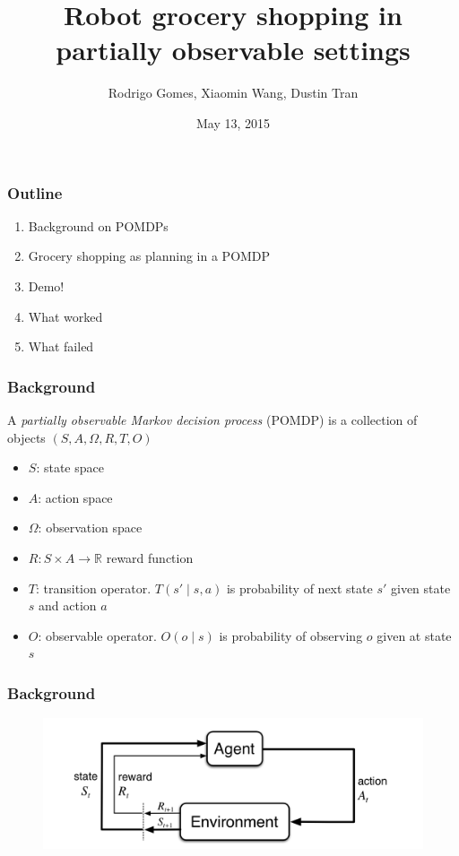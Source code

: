 \documentclass[10pt, compress]{beamer}
\title{Robot grocery shopping in partially observable settings}
\subtitle{}
\date{May 13, 2015}
\author{Rodrigo Gomes, Xiaomin Wang, Dustin Tran}
\institute{MIT, 6.834j Cognitive Robotics}
\begin{document}

\maketitle

\begin{frame}[fragile]
  \frametitle{Outline}

  \begin{enumerate}
  \item Background on POMDPs
  \item Grocery shopping as planning in a POMDP
  \item Demo!
  \item What worked
  \item What failed
  \end{enumerate}

\end{frame}

\begin{frame}[fragile]
  \frametitle{Background}

  A \emph{partially observable Markov decision process} (POMDP) is a collection
  of objects $(S,A,\Omega,R,T,O)$

  \begin{itemize}
  \item $S$: state space
  \item $A$: action space
  \item $\Omega$: observation space
  \item $R: S \times A \rightarrow \mathbb{R}$ reward function
  \item $T$: transition operator. $T(s' \mid s,a)$ is probability of next state $s'$ given state $s$ and action $a$
  \item $O$: observable operator. $O(o \mid s)$ is probability of observing
  $o$ given at state $s$
  \end{itemize}
\end{frame}

\begin{frame}[fragile]
  \frametitle{Background}

  \begin{figure}[ht]
  \begin{center}
  \centerline{\includegraphics[width=1.25\textwidth]{img/agent_environment_untitled.png}}
  \end{center}
  \end{figure}
\end{frame}
\end{document}
